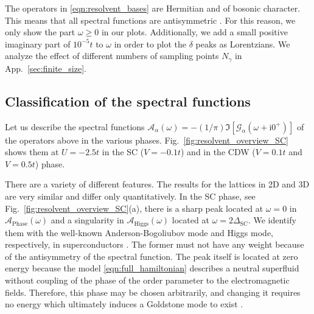 \documentclass[
    reprint, 
    aps,
    preprintnumbers,
    twocolumn,
    prb,
    superscriptaddress
]{revtex4-2}
\newcommand{\im}{\mathrm{i}}
\newcommand{\spectral}[1]{\mathcal{A}_\text{#1}  (\omega)}
\begin{document}
The operators in \eqref{eqn:resolvent_bases} are Hermitian and of bosonic character. 
This means that all spectral functions are antisymmetric \cite{rickayzen80}.
For this reason, we only show the part  $\omega \geq 0$ in our plots. 
Additionally, we add a small positive imaginary part of $10^{-5}t$ to $\omega$ 
in order to plot the $\delta$ peaks as Lorentzians.
We analyze the effect of different numbers of sampling points $N_\gamma$ in App.\ \ref{sec:finite_size}.


\subsection{Classification of the spectral functions}

Let us describe the spectral functions 
$\mathcal{A}_\alpha (\omega) = - (1/\pi) \Im [\mathcal{G}_\alpha (\omega + \im 0^+)]$ of
the operators above in the various phases.
Fig.\ \ref{fig:resolvent_overview_SC} shows them at $U = -2.5t$ in the SC ($V=-0.1t$) and  in the 
CDW ($V=0.1t$ and $V=0.5t$) phase.

There are a variety of different features. 
The results for the lattices in 2D and 3D are very similar and differ only quantitatively.
In the SC phase, see Fig.\ \ref{fig:resolvent_overview_SC}(a), 
there is a sharp peak located at $\omega=0$ in $\spectral{Phase}$ and a 
singularity in $\spectral{Higgs}$ located at $\omega=2\Delta_\text{SC}$.
We identify them with the well-known Anderson-Bogoliubov mode and Higgs mode, respectively, in superconductors 
\cite{Bogoljubov1958,Anderson58,Brieskorn74,Schmid1975,simanek1975,schon76,Kulik1981,Maiti2015,Sun2020,Fan22,Schmid1975,Varma02,Cea14,Measson14,Tsuji15,Krull16,Mueller2019,Schwarz20}.
The former must not have any weight because of the antisymmetry of the spectral function.
The peak itself is located at zero energy because the model \eqref{eqn:full_hamiltonian} 
describes a neutral superfluid without coupling of the phase of the order parameter to the electromagnetic fields.
Therefore, this phase may be chosen arbitrarily, and changing it requires no energy 
which ultimately induces a Goldstone mode to exist \cite{Goldstone1961,Anderson63}.
\end{document}
